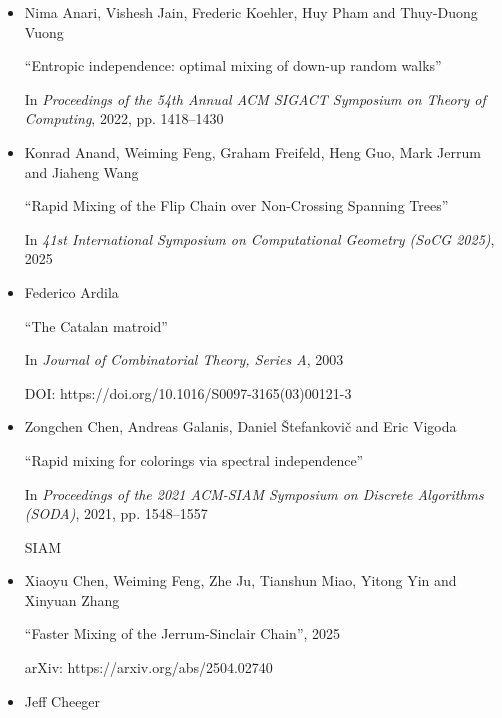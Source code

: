 \begin{itemize}
“$\lambda_{1}$, isoperimetric inequalities for graphs, and superconcentrators”

In \emph{Journal of Combinatorial Theory, Series B} \textbf{38.1}

Elsevier, 1985, pp. 73–88


      

\item[] [Ana+22]
Nima Anari, Vishesh Jain, Frederic Koehler, Huy Pham and Thuy-Duong Vuong

“Entropic independence: optimal mixing of down-up random walks”

In \emph{Proceedings of the 54th Annual ACM SIGACT Symposium on Theory of Computing}, 2022, pp. 1418–1430


      

\item[] [Ana+25]
Konrad Anand, Weiming Feng, Graham Freifeld, Heng Guo, Mark Jerrum and Jiaheng Wang

“Rapid Mixing of the Flip Chain over Non-Crossing Spanning Trees”

In \emph{41st International Symposium on Computational Geometry (SoCG 2025)}, 2025


      

\item[] [Ard03]
Federico Ardila

“The Catalan matroid”

In \emph{Journal of Combinatorial Theory, Series A}, 2003

DOI: https://doi.org/10.1016/S0097-3165(03)00121-3


      

\item[] [Che+21]
Zongchen Chen, Andreas Galanis, Daniel Štefankovič and Eric Vigoda

“Rapid mixing for colorings via spectral independence”

In \emph{Proceedings of the 2021 ACM-SIAM Symposium on Discrete Algorithms (SODA)}, 2021, pp. 1548–1557

SIAM


      

\item[] [Che+25]
Xiaoyu Chen, Weiming Feng, Zhe Ju, Tianshun Miao, Yitong Yin and Xinyuan Zhang

“Faster Mixing of the Jerrum-Sinclair Chain”, 2025

arXiv: https://arxiv.org/abs/2504.02740


      

\item[] [Che15]
Jeff Cheeger


\end{itemize}
